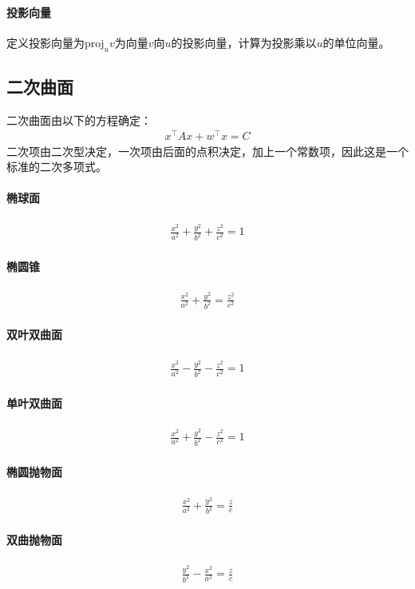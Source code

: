 \documentclass[12pt,a4paper,UTF8]{ctexbook}
\theoremstyle{plain}
\begin{document}
\paragraph{投影向量}
定义投影向量为$\mathrm{proj}_u v$为向量$v$向$u$的投影向量，计算为投影乘以$u$的单位向量。
\subsection{二次曲面}
二次曲面由以下的方程确定：
\begin{align*}
    x^\top A x+w^\top x=C
\end{align*}
二次项由二次型决定，一次项由后面的点积决定，加上一个常数项，因此这是一个标准的二次多项式。
\paragraph{椭球面}
\begin{align*} 
    \frac{x^2}{a^2}+\frac{y^2}{b^2}+\frac{z^2}{c^2}=1
\end{align*}
\paragraph{椭圆锥}
\begin{align*} 
    \frac{x^2}{a^2}+\frac{y^2}{b^2}=\frac{z^2}{c^2}
\end{align*}
\paragraph{双叶双曲面}
\begin{align*} 
    \frac{x^2}{a^2}-\frac{y^2}{b^2}-\frac{z^2}{c^2}=1
\end{align*}
\paragraph{单叶双曲面}
\begin{align*} 
    \frac{x^2}{a^2}+\frac{y^2}{b^2}-\frac{z^2}{c^2}=1
\end{align*}
\paragraph{椭圆抛物面}
\begin{align*} 
    \frac{x^2}{a^2}+\frac{y^2}{b^2}=\frac{z}{c}
\end{align*}
\paragraph{双曲抛物面}
\begin{align*} 
    \frac{y^2}{b^2}-\frac{x^2}{a^2}=\frac{z}{c}
\end{align*}
\end{document}
